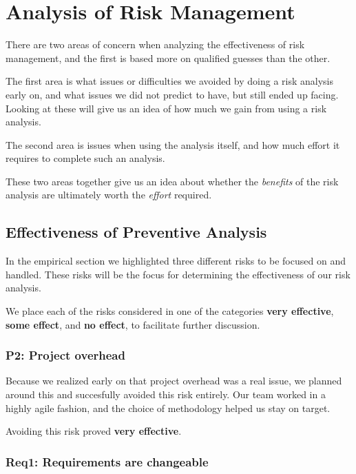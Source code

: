 \section{Analysis of Risk Management}

There are two areas of concern when analyzing the effectiveness of risk management, and the first is
based more on qualified guesses than the other.

The first area is what issues or difficulties we avoided by doing a risk analysis early on, and what
issues we did not predict to have, but still ended up facing. Looking at these will give us an idea
of how much we gain from using a risk analysis.

The second area is issues when using the analysis itself, and how much effort it requires to complete
such an analysis.

These two areas together give us an idea about whether the \emph{benefits} of the risk analysis are
ultimately worth the \emph{effort} required.

\subsection{Effectiveness of Preventive Analysis}

In the empirical section we highlighted three different risks to be focused on and handled. These risks
will be the focus for determining the effectiveness of our risk analysis.

We place each of the risks considered in one of the categories \textbf{very effective}, \textbf{some
effect}, and \textbf{no effect}, to facilitate further discussion.

\subsubsection{P2: Project overhead}

Because we realized early on that project overhead was a real issue, we planned around this and succesfully
avoided this risk entirely. Our team worked in a highly agile fashion, and the choice of methodology helped
us stay on target.

Avoiding this risk proved \textbf{very effective}.

\subsubsection{Req1: Requirements are changeable}

